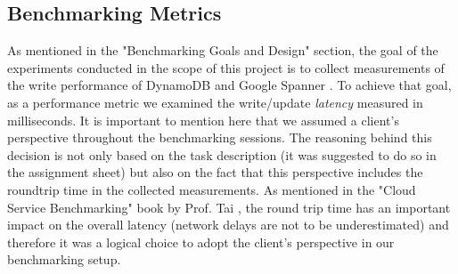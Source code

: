 \documentclass[letterpaper, 10 pt, conference]{ieeeconf}  %
\begin{document}
\subsection{Benchmarking Metrics}
As mentioned in the "Benchmarking Goals and Design" section, the goal of the experiments conducted in the scope of this project is to collect measurements of the write performance of DynamoDB \cite{DynamoWebPage} and Google Spanner \cite{SpannerWebPage}. To achieve that goal, as a performance metric we examined the write/update \textit{latency} measured in milliseconds. It is important to mention here that we assumed a client's perspective throughout the benchmarking sessions. The reasoning behind this decision is not only based on the task description (it was suggested to do so in the assignment sheet) but also on the fact that this perspective includes the roundtrip time in the collected measurements. As mentioned in the "Cloud Service Benchmarking" book by Prof. Tai \cite{StefanTaiBook}, the round trip time has an important impact on the overall latency (network delays are not to be underestimated) and therefore it was a logical choice to adopt the client's perspective in our benchmarking setup.
\end{document}
